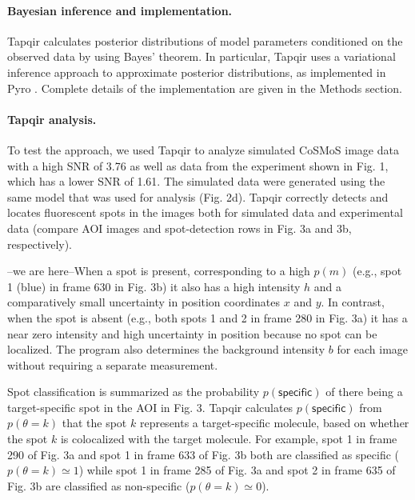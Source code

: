 \paragraph{Bayesian inference and implementation.}
Tapqir calculates posterior distributions of model parameters conditioned on the observed data by using Bayes' theorem. In particular, Tapqir uses a variational inference approach to approximate posterior distributions, as implemented in Pyro \cite{Bingham2019-qy}.  Complete details of the implementation are given in the Methods section.

\paragraph{Tapqir analysis.} %
To test the approach, we used Tapqir to analyze simulated CoSMoS image data with a high SNR of 3.76 as well as data from the experiment shown in Fig. 1, which has a lower SNR of 1.61. The simulated data were generated using the same model that was used for analysis (Fig. 2d).  Tapqir correctly detects and locates fluorescent spots in the images both for simulated data and experimental data (compare AOI images and spot-detection rows in Fig. 3a and 3b, respectively).

--we are here--When a spot is present, corresponding to a high $p(m)$ (e.g., spot 1 (blue) in frame 630 in Fig. 3b) it also has a high intensity $h$ and a comparatively small uncertainty in position coordinates $x$ and $y$. In contrast, when the spot is absent (e.g., both spots 1 and 2 in frame 280 in Fig. 3a) it has a near zero intensity and high uncertainty in position because no spot can be localized. The program also determines the background intensity $b$ for each image without requiring a separate measurement. 

Spot classification is summarized as the probability  $p(\mathsf{specific})$ of there being a target-specific spot in the AOI in Fig. 3. Tapqir calculates $p(\mathsf{specific})$ from  $p(\theta=k)$ that the spot $k$ represents a target-specific molecule, based on whether the spot $k$ is colocalized with the target molecule.  For example, spot 1 in frame 290 of Fig. 3a and spot 1 in frame 633 of Fig. 3b both are classified as specific ($p(\theta=k) \simeq 1$) while spot 1 in frame 285 of Fig. 3a and spot 2 in frame 635 of Fig. 3b are classified as non-specific ($p(\theta=k) \simeq 0$).  



